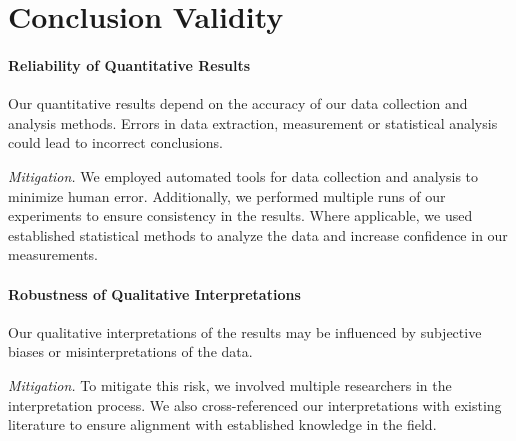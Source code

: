 
\section{Conclusion Validity}\label{sec:conclusion-validity}

\paragraph{Reliability of Quantitative Results}
Our quantitative results depend on the accuracy of our data collection and analysis methods.
Errors in data extraction, measurement or statistical analysis could lead to incorrect conclusions.

\textit{Mitigation.}
We employed automated tools for data collection and analysis to minimize human error.
Additionally, we performed multiple runs of our experiments to ensure consistency in the results.
Where applicable, we used established statistical methods to analyze the data and increase confidence in our measurements.

\paragraph{Robustness of Qualitative Interpretations}
Our qualitative interpretations of the results may be influenced by subjective biases or misinterpretations of the data.

\textit{Mitigation.}
To mitigate this risk, we involved multiple researchers in the interpretation process.
We also cross-referenced our interpretations with existing literature to ensure alignment with established knowledge in the field.